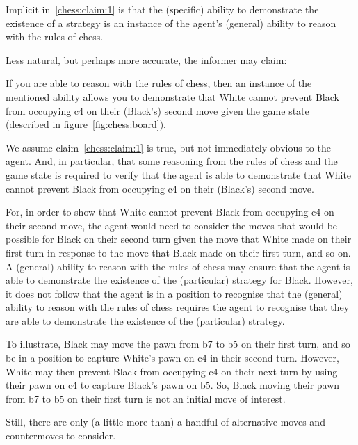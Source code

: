 \documentclass[10pt]{article}
\begin{document}
{\color{red}
  \begin{note}
    Implicit in~\ref{chess:claim:1} is that the (specific) ability to demonstrate the existence of a strategy is an instance of the agent's (general) ability to reason with the rules of chess.

  Less natural, but perhaps more accurate, the informer may claim:
  \item\label{chess:claim:1:conditional:extend} If you are able to reason with the rules of chess, then an instance of the mentioned ability allows you to demonstrate that White cannot prevent Black from occupying c4 on their (Black's) second move given the game state (described in figure~\ref{fig:chess:board}).
  \end{note}}

\begin{note}
  We assume claim~\ref{chess:claim:1} is true, but not immediately obvious to the agent.
  And, in particular, that some reasoning from the rules of chess and the game state is required to verify that the agent is able to demonstrate that White cannot prevent Black from occupying c4 on their (Black's) second move.

  For, in order to show that White cannot prevent Black from occupying c4 on their second move, the agent would need to consider the moves that would be possible for Black on their second turn given the move that White made on their first turn in response to the move that Black made on their first turn, and so on.
  A (general) ability to reason with the rules of chess may ensure that the agent is able to demonstrate the existence of the (particular) strategy for Black.
  However, it does not follow that the agent is in a position to recognise that the (general) ability to reason with the rules of chess requires the agent to recognise that they are able to demonstrate the existence of the (particular) strategy.

  To illustrate, Black may move the pawn from b7 to b5 on their first turn, and so be in a position to capture White's pawn on c4 in their second turn.
  However, White may then prevent Black from occupying c4 on their next turn by using their pawn on c4 to capture Black's pawn on b5.
  So, Black moving their pawn from b7 to b5 on their first turn is not an initial move of interest.

  Still, there are only (a little more than) a handful of alternative moves and countermoves to consider.
\end{note}
\end{document}
